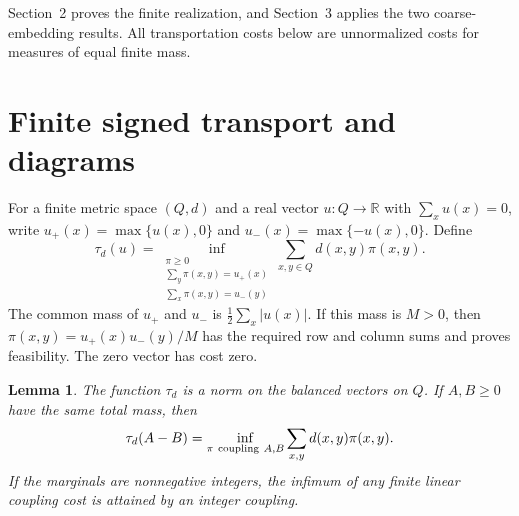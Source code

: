 \documentclass[11pt]{article}
\newtheorem{lemma}[theorem]{Lemma}
\theoremstyle{remark}
\newcommand{\R}{\mathbb R}
\begin{document}
Section~2 proves the finite realization, and Section~3 applies the two coarse-embedding results. All transportation costs below are unnormalized costs for measures of equal finite mass.

\section{Finite signed transport and diagrams}

For a finite metric space \((Q,d)\) and a real vector \(u:Q\to\R\) with \(\sum_xu(x)=0\), write \(u_+(x)=\max\{u(x),0\}\) and \(u_-(x)=\max\{-u(x),0\}\). Define
\begin{equation}
 \tau_d(u)=
 \inf_{\substack{\pi\ge0\\
             \sum_y\pi(x,y)=u_+(x)\\
             \sum_x\pi(x,y)=u_-(y)}}
             \sum_{x,y\in Q}d(x,y)\pi(x,y).
 \label{eq:transport}
\end{equation}
The common mass of \(u_+\) and \(u_-\) is \(\frac12\sum_x|u(x)|\).
If this mass is \(M>0\), then \(\pi(x,y)=u_+(x)u_-(y)/M\) has the required row and column sums and proves feasibility. The zero vector has cost zero.

\begin{lemma}\label{lem:finite}
The function \(\tau_d\) is a norm on the balanced vectors on \(Q\). If \(A,B\ge0\) have the same total mass, then
\begin{equation}
 \tau_d(A-B)=\inf_{\pi\ {\rm coupling}\ A,B}\sum_{x,y}d(x,y)\pi(x,y).
 \label{eq:cancel}
\end{equation}
If the marginals are nonnegative integers, the infimum of any finite linear coupling cost is attained by an integer coupling.
\end{lemma}
\end{document}
